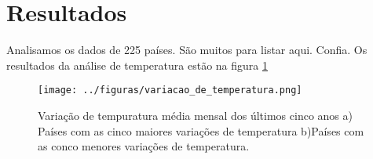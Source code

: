 \documentclass{article}
\begin{document}
\section{Resultados}

	Analisamos os dados de 225 países. São muitos para listar aqui. Confia.
Os resultados da análise de temperatura estão na figura \ref{fig:variacao}

\begin{figure}[!htb]
	\centering
	\texttt{[image: ../figuras/variacao\_de\_temperatura.png]}
	\centering
	\caption{
		Variação de tempuratura média mensal dos últimos cinco anos
		a) Países com as cinco maiores variações de temperatura
		b)Países com as conco menores variações de temperatura.
	}
	\label{fig:variacao}
\end{figure}



\end{document}
